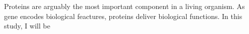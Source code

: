 Proteins are arguably the most important component in a living organism. As gene encodes biological feactures, proteins deliver biological functions.    In this study, I will be 